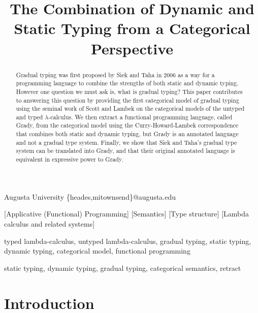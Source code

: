 \documentclass[preprint]{sigplanconf}
\begin{document}

\titlebanner{}
\preprintfooter{}

\title{The Combination of Dynamic and Static Typing from a Categorical Perspective}

           {Augusta University}
           {\{heades,mitownsend\}@augusta.edu}

\maketitle

[Applicative (Functional) Programming]
[Semantics]
[Type structure]
[Lambda calculus and related systems]

\terms typed lambda-calculus, untyped lambda-calculus, gradual typing,
static typing, dynamic typing, categorical model, functional
programming

\keywords static typing, dynamic typing, gradual typing, categorical
semantics, retract

\begin{abstract}
  Gradual typing was first proposed by Siek and Taha in 2006 as a way
  for a programming language to combine the strengths of both static
  and dynamic typing.  However one question we must ask is, what is
  gradual typing?  This paper contributes to answering this question
  by providing the first categorical model of gradual typing using the
  seminal work of Scott and Lambek on the categorical models of the
  untyped and typed $\lambda$-calculus.  We then extract a functional
  programming language, called Grady, from the categorical model using
  the Curry-Howard-Lambek correspondence that combines both static and
  dynamic typing, but Grady is an annotated language and not a gradual
  type system.  Finally, we show that Siek and Taha's gradual type
  system can be translated into Grady, and that their original
  annotated language is equivalent in expressive power to Grady.
\end{abstract}

\section{Introduction}
\label{sec:introduction}

\end{document}
